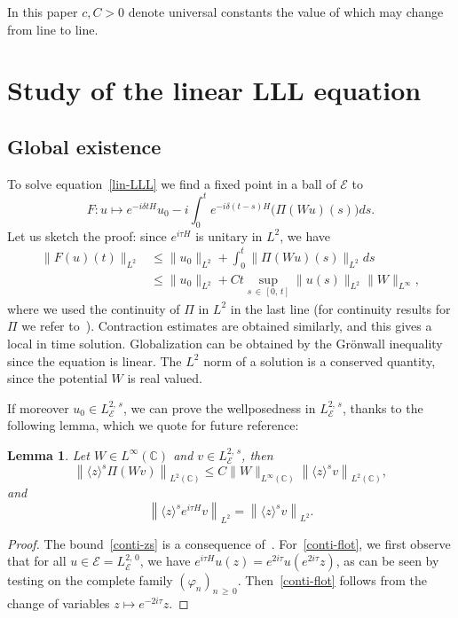 \documentclass[10pt]{amsart}
\newtheorem{lemm}[theo]{Lemma}\newtheorem{prop}[theo]{Proposition}\newtheorem{coro}[theo]{Corollary}\newtheorem{conj}[theo]{Conjecture}
\theoremstyle{definition}\newtheorem{defi}[theo]{Definition}\newtheorem{rema}[theo]{Remark}\newtheorem{exam}[theo]{Example}\newtheorem{exem}[theo]{Example}\newtheorem{nota}[theo]{Notation}
\newcommand{\C}{\mathbb{C}}
\newcommand{\E}{\mathcal{E}}
\newcommand{\<}{\langle}
\renewcommand{\>}{\rangle}
\renewcommand{\phi}{\varphi}
\begin{document}
In this paper $c,C>0$ denote universal constants the value of which may change from line to line.


\section{Study of the linear LLL equation}\label{Sect3}


\subsection{Global existence}
To solve equation~\eqref{lin-LLL} we find a fixed point in a ball of $\E$ to
\[
F: u \longmapsto e^{-i \delta t H}u_0-i \int_0^te^{-i\delta (t-s) H} \big(\Pi(Wu)(s)\big)ds.
\]
Let us sketch the proof: since $e^{i\tau H}$ is unitary in $L^2$, we have
\begin{align*}
\|F(u)(t)\|_{L^2} &\leq \|u_0\|_{L^2}+ \int_{0}^t \|\Pi(Wu)(s)\|_{L^2} ds \\
&\leq \|u_0\|_{L^2}+ Ct \sup_{s\,\in\,[0,\,t]} \|u(s)\|_{L^2} \|W\|_{L^\infty},
\end{align*}
where we used the continuity of $\Pi$ in $L^2$ in the last line (for continuity results for $\Pi$ we refer to~\cite[Proposition~3.1]{GGT}). Contraction estimates are obtained similarly, and this gives a local in time solution. Globalization can be obtained by the Gr\"onwall inequality since the equation is linear. The $L^2$ norm of a solution is a conserved quantity, since the potential $W$ is real valued.

If moreover $u_0 \in L^{2,\,s}_\E$, we can prove the wellposedness in $L^{2,\,s}_\E$, thanks to the following lemma, which we quote for future reference:

\begin{lemm}
Let $W \in L^{\infty}(\C)$ and $v \in L^{2,\,s}_\E$, then
\begin{equation}\label{conti-zs}
\left\| \langle z \rangle^s \Pi \left(Wv\right) \right\|_{L^2(\C)} \leq C \| W\|_{L^\infty(\C)} \left\|\langle z \rangle^s v\right\|_{L^2(\C)},
\end{equation}
and
\begin{equation}\label{conti-flot}
\left\| \langle z \rangle^s e^{i\tau H} v \right\|_{L^2} = \left\| \langle z \rangle^s v \right\|_{L^2}.
\end{equation}
\end{lemm}

\begin{proof}
The bound~\eqref{conti-zs} is a consequence of~\cite[Proposition~3.1]{GGT}. For~\eqref{conti-flot}, we first observe that for all $u \in \E=L^{2,\,0}_\E$, we have $e^{i \tau H}u(z)=e^{2i\tau }u(e^{2i\tau}z)$, as can be seen by testing on the complete family $(\phi_n)_{n\,\geq\,0}$. Then~\eqref{conti-flot} follows from the change of variables $z \mapsto e^{-2i\tau }z$.
\end{proof}
\end{document}
